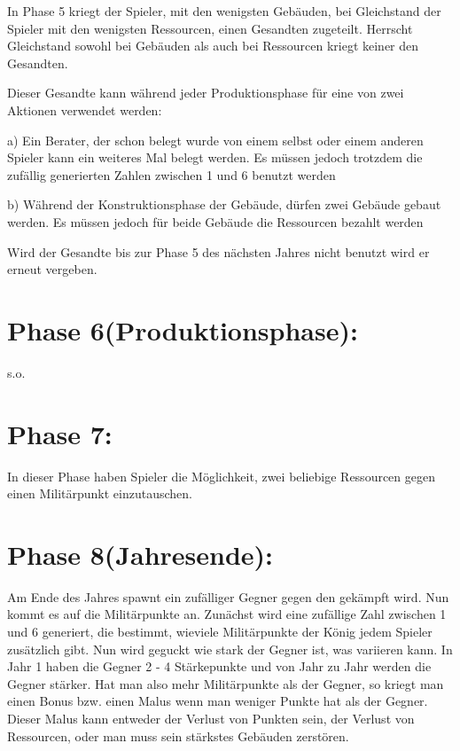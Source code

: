 \documentclass[a4paper]{scrreprt}
\begin{document}
In Phase 5 kriegt der Spieler, mit den wenigsten Gebäuden, bei Gleichstand der Spieler mit den wenigsten Ressourcen, einen Gesandten zugeteilt.
Herrscht Gleichstand sowohl bei Gebäuden als auch bei Ressourcen kriegt keiner den Gesandten.

Dieser Gesandte kann während jeder Produktionsphase für eine von zwei Aktionen verwendet werden:

a) Ein Berater, der schon belegt wurde von einem selbst oder einem anderen Spieler kann ein weiteres Mal belegt werden. Es müssen jedoch trotzdem die zufällig generierten Zahlen zwischen 1 und 6 benutzt werden

b) Während der Konstruktionsphase der Gebäude, dürfen zwei Gebäude gebaut werden. Es müssen jedoch für beide Gebäude die Ressourcen bezahlt werden

Wird der Gesandte bis zur Phase 5 des nächsten Jahres nicht benutzt wird er erneut vergeben.


\section{Phase 6(Produktionsphase):}

s.o.


\section{Phase 7:}

In dieser Phase haben Spieler die Möglichkeit, zwei beliebige Ressourcen gegen einen Militärpunkt einzutauschen.


\section{Phase 8(Jahresende):}

Am Ende des Jahres spawnt ein zufälliger Gegner gegen den gekämpft wird.
Nun kommt es auf die Militärpunkte an.
Zunächst wird eine zufällige Zahl zwischen 1 und 6 generiert, die bestimmt, wieviele Militärpunkte der König jedem Spieler zusätzlich gibt.
Nun wird geguckt wie stark der Gegner ist, was variieren kann. In Jahr 1 haben die Gegner 2 - 4 Stärkepunkte und von Jahr zu Jahr werden die Gegner stärker.
Hat man also mehr Militärpunkte als der Gegner, so kriegt man einen Bonus bzw. einen Malus wenn man weniger Punkte hat als der Gegner.
Dieser Malus kann entweder der Verlust von Punkten sein, der Verlust von Ressourcen, oder man muss sein stärkstes Gebäuden zerstören.
\end{document}
